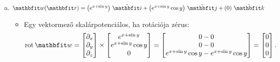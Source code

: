 \documentclass[lang=magyar]{math-handout}
\begin{document}
\begin{exercise}
{\begin{enumerate}[a)]
\begin{itemize}
                    A keresett vektorpotenciál:
                    \[
                      \rvec V(\rvec r)
                      =
                      \ijk{xz + \frac{z^2}{2}}
                      {\frac{x^2}{2} + xy - \frac{z^2}{2} - yz}
                      {0}
                      \text.
                    \]
            \end{itemize}

      \item $\rvec w(\rvec r) = \ijk{e^{x + \sin y}}{e^{x + \sin y} \cos y}{0}$
            \begin{itemize}
              \item Egy vektormező skalárpotenciálos, ha rotációja zérus:
                    \[
                      \rot \rvec w
                      =
                      \begin{bmatrix}
                        \partial_x \\ \partial_y \\ \partial_z
                      \end{bmatrix}
                      \times
                      \begin{bmatrix}
                        e^{x + \sin y} \\ e^{x + \sin y} \cos y \\ 0
                      \end{bmatrix}
                      =
                      \begin{bmatrix}
                        0 - 0 \\ 0 - 0 \\ e^{x + \sin y} \cos y - e^{x + \sin y} \cos y
                      \end{bmatrix}
                      =
                      \begin{bmatrix}
                        0 \\ 0 \\ 0
                      \end{bmatrix}
                      \text.
                    \]


\end{itemize}
\end{enumerate}}
\end{exercise}
\end{document}
